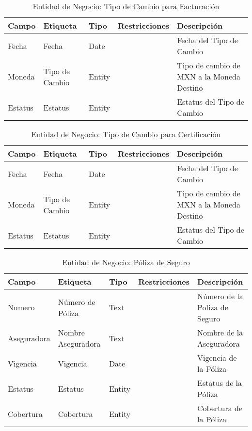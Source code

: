 \begin{table}[H]
	\caption{Entidad de Negocio: Tipo de Cambio para Facturación}
	\label{tab:fields-dom-TipoCambioFacturacion}
	\begin{center}
	\begin{tabular}{ l l l l l }
		\hline
		\textbf{Campo} &
		\textbf{Etiqueta} &
		\textbf{Tipo} &
		\textbf{Restricciones} &
		\textbf{Descripción} \\
		\hline
		Fecha &
		Fecha &
		Date &
		 &
		Fecha del Tipo de Cambio \\
		Moneda &
		Tipo de Cambio &
		Entity &
		 &
		Tipo de cambio de MXN a la Moneda Destino \\
		Estatus &
		Estatus &
		Entity &
		 &
		Estatus del Tipo de Cambio \\
		\hline
	\end{tabular}
	\end{center}
\end{table}
\begin{table}[H]
	\caption{Entidad de Negocio: Tipo de Cambio para Certificación}
	\label{tab:fields-dom-TipoCambioCertificacion}
	\begin{center}
	\begin{tabular}{ l l l l l }
		\hline
		\textbf{Campo} &
		\textbf{Etiqueta} &
		\textbf{Tipo} &
		\textbf{Restricciones} &
		\textbf{Descripción} \\
		\hline
		Fecha &
		Fecha &
		Date &
		 &
		Fecha del Tipo de Cambio \\
		Moneda &
		Tipo de Cambio &
		Entity &
		 &
		Tipo de cambio de MXN a la Moneda Destino \\
		Estatus &
		Estatus &
		Entity &
		 &
		Estatus del Tipo de Cambio \\
		\hline
	\end{tabular}
	\end{center}
\end{table}
\begin{table}[H]
	\caption{Entidad de Negocio: Póliza de Seguro}
	\label{tab:fields-dom-PolizaSeguro}
	\begin{center}
	\begin{tabular}{ l l l l l }
		\hline
		\textbf{Campo} &
		\textbf{Etiqueta} &
		\textbf{Tipo} &
		\textbf{Restricciones} &
		\textbf{Descripción} \\
		\hline
		Numero &
		Número de Póliza &
		Text &
		 &
		Número de la Poliza de Seguro \\
		Aseguradora &
		Nombre Aseguradora &
		Text &
		 &
		Nombre de la Aseguradora \\
		Vigencia &
		Vigencia &
		Date &
		 &
		Vigencia de la Póliza \\
		Estatus &
		Estatus &
		Entity &
		 &
		Estatus de la Póliza \\
		Cobertura &
		Cobertura &
		Entity &
		 &
		Cobertura de la Póliza \\
		\hline
	\end{tabular}
	\end{center}
\end{table}
